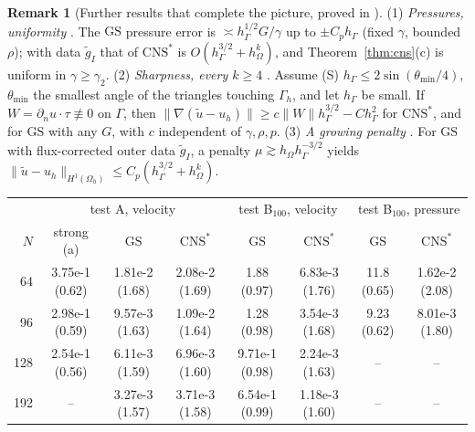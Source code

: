 \documentclass[5p,times]{elsarticle}
\theoremstyle{definition}
\newtheorem{remark}{Remark}
\newcommand{\hG}{h_\Gamma}
\newcommand{\hO}{h_\Omega}
\newcommand{\Gh}{\Gamma_h}
\newcommand{\Oh}{\Omega_h}
\newcommand{\dn}{\partial_n}
\newcommand{\ut}{\tilde u}
\newcommand{\norm}[1]{\lVert #1\rVert}
\newcommand{\GS}{\mathrm{GS}}
\newcommand{\CNS}{\mathrm{CNS}^\ast}
\newcommand{\ext}[1]{\cite[#1]{PadhiExt}}
\begin{document}
\begin{remark}[Further results that complete the picture, proved in \cite{PadhiExt}]\label{rem:further}
(1) \emph{Pressures, uniformity} \ext{Thms.~8.11, 8.7, 7.30, 7.33}. The $\GS$ pressure error is $\asymp\hG^{1/2}G/\gamma$ up to $\pm C_p\hG$ (fixed $\gamma$, bounded $\rho$); with data $\tilde g_I$ that of $\CNS$ is $O(\hG^{3/2}+\hO^k)$, and Theorem~\ref{thm:cns}(c) is uniform in $\gamma\ge\gamma_2$.
(2) \emph{Sharpness, every $k\ge4$} \ext{Thms.~7.8, 7.24}. Assume (S) $\hG\le2\sin(\theta_{\min}/4)$, $\theta_{\min}$ the smallest angle of the triangles touching $\Gh$, and let $\hG$ be small. If $W=\dn u\cdot\tau\not\equiv0$ on $\Gamma$, then $\norm{\nabla(\ut-u_h)}\ge c\norm W\hG^{3/2}-C\hG^2$ for $\CNS$, and for $\GS$ with any $G$, with $c$ independent of $\gamma,\rho,p$.
(3) \emph{A growing penalty} \ext{Thm.~7.30, Cor.~7.34}. For $\GS$ with flux-corrected outer data $\tilde g_I$, a penalty $\mu\gtrsim\hO\hG^{-3/2}$ yields $\norm{\ut-u_h}_{H^1(\Oh)}\le C_p(\hG^{3/2}+\hO^k)$.
\end{remark}

\begin{\tabenv}[!tb]
\centering\footnotesize\setlength{\tabcolsep}{3pt}
\caption{$H^1$ seminorm errors (rate), tests A and B$_{100}$, and pressure errors $\norm{p^\ast-p_h}_{L^2(\Oh)}$ for B$_{100}$. Strong: $u_h=0$ at the nodes of $\Gh$, mesh (a) (wall vertices in two or four triangles, violating (M2)). $\GS$, $\CNS$: standard mesh. Rates are computed from the preceding mesh in $N\in\{16,24,32,48,64,96,128,192\}$ using $r=\log(E_{\mathrm{previous}}/E_{\mathrm{current}})/\log(h_{\Omega,\mathrm{previous}}/h_{\Omega,\mathrm{current}})$; at $N=256$, $\GS$ and $\CNS$ give $1.55$, $1.56$ on test A.}\label{tab:rates}
\begin{tabular}{rccccccc}
\toprule
 & \multicolumn{3}{c}{test A, velocity} & \multicolumn{2}{c}{test B$_{100}$, velocity} & \multicolumn{2}{c}{test B$_{100}$, pressure}\\
\cmidrule(lr){2-4}\cmidrule(lr){5-6}\cmidrule(lr){7-8}
$N$ & strong (a) & $\GS$ & $\CNS$ & $\GS$ & $\CNS$ & $\GS$ & $\CNS$\\
\midrule
64 & 3.75e-1 (0.62) & 1.81e-2 (1.68) & 2.08e-2 (1.69) & 1.88 (0.97) & 6.83e-3 (1.76) & 11.8 (0.65) & 1.62e-2 (2.08)\\
96 & 2.98e-1 (0.59) & 9.57e-3 (1.63) & 1.09e-2 (1.64) & 1.28 (0.98) & 3.54e-3 (1.68) & 9.23 (0.62) & 8.01e-3 (1.80)\\
128 & 2.54e-1 (0.56) & 6.11e-3 (1.59) & 6.96e-3 (1.60) & 9.71e-1 (0.98) & 2.24e-3 (1.63) & -- & --\\
192 & -- & 3.27e-3 (1.57) & 3.71e-3 (1.58) & 6.54e-1 (0.99) & 1.18e-3 (1.60) & -- & --\\
\bottomrule
\end{tabular}
\end{\tabenv}
\end{document}

